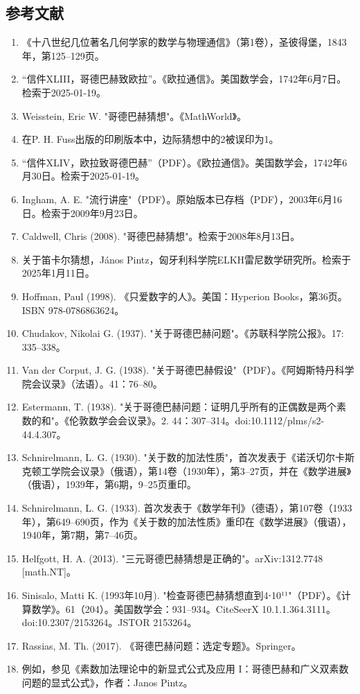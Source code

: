 \subsection{参考文献}  
\begin{enumerate}
\item 《十八世纪几位著名几何学家的数学与物理通信》（第1卷），圣彼得堡，1843年，第125–129页。  
\item “信件XLIII，哥德巴赫致欧拉”。《欧拉通信》。美国数学会，1742年6月7日。检索于2025-01-19。  
\item Weisstein, Eric W. "哥德巴赫猜想"。《MathWorld》。  
\item 在P. H. Fuss出版的印刷版本中，边际猜想中的2被误印为1。  
\item “信件XLIV，欧拉致哥德巴赫”（PDF）。《欧拉通信》。美国数学会，1742年6月30日。检索于2025-01-19。  
\item Ingham, A. E. "流行讲座"（PDF）。原始版本已存档（PDF），2003年6月16日。检索于2009年9月23日。  
\item Caldwell, Chris (2008). "哥德巴赫猜想"。检索于2008年8月13日。  
\item 关于笛卡尔猜想，János Pintz，匈牙利科学院ELKH雷尼数学研究所。检索于2025年1月11日。  
\item Hoffman, Paul (1998). 《只爱数字的人》。美国：Hyperion Books，第36页。ISBN 978-0786863624。  
\item Chudakov, Nikolai G. (1937). "关于哥德巴赫问题"。《苏联科学院公报》。17: 335–338。
\item Van der Corput, J. G. (1938). "关于哥德巴赫假设"（PDF）。《阿姆斯特丹科学院会议录》（法语）。41：76–80。  
\item Estermann, T. (1938). "关于哥德巴赫问题：证明几乎所有的正偶数是两个素数的和"。《伦敦数学会会议录》。2. 44：307–314。doi:10.1112/plms/s2-44.4.307。  
\item Schnirelmann, L. G. (1930). "关于数的加法性质"，首次发表于《诺沃切尔卡斯克顿工学院会议录》（俄语），第14卷（1930年），第3–27页，并在《数学进展》（俄语），1939年，第6期，9–25页重印。  
\item Schnirelmann, L. G. (1933). 首次发表于《数学年刊》（德语），第107卷（1933年），第649–690页，作为《关于数的加法性质》重印在《数学进展》（俄语），1940年，第7期，第7–46页。  
\item Helfgott, H. A. (2013). "三元哥德巴赫猜想是正确的"。arXiv:1312.7748 [math.NT]。  
\item Sinisalo, Matti K. (1993年10月). "检查哥德巴赫猜想直到4⋅10¹¹"（PDF）。《计算数学》。61（204）。美国数学会：931–934。CiteSeerX 10.1.1.364.3111。doi:10.2307/2153264。JSTOR 2153264。  
\item Rassias, M. Th. (2017). 《哥德巴赫问题：选定专题》。Springer。  
\item 例如，参见《素数加法理论中的新显式公式及应用 I：哥德巴赫和广义双素数问题的显式公式》，作者：Janos Pintz。


\end{enumerate}


